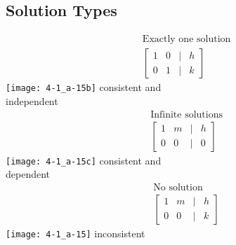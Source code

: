 \documentclass[14pt]{extarticle}
\begin{document}
\cleardoublepage

\subsection*{Solution Types}
\begin{multicols}{3}
	\begin{align*}
		&\text{Exactly one solution} \\
		&\begin{bmatrix}
			1 & 0 & | & h\\
			0 & 1 & | & k
		\end{bmatrix} 
	\end{align*}
\texttt{[image: 4-1\_a-15b]}
consistent and \\independent
\vfill\null
\columnbreak
	\begin{align*}
		&\text{Infinite solutions} \\
		&\begin{bmatrix}
			1 & m & | & h\\
			0 & 0 & | & 0
		\end{bmatrix} 
	\end{align*}
\texttt{[image: 4-1\_a-15c]}
consistent and \\dependent
\vfill\null
\columnbreak
	\begin{align*}
		&\text{No solution} \\
		&\begin{bmatrix}
			1 & m & | & h\\
			0 & 0 & | & k
		\end{bmatrix} 
	\end{align*}
\texttt{[image: 4-1\_a-15]}
inconsistent\\
\vfill\null
\end{multicols}
\end{document}
